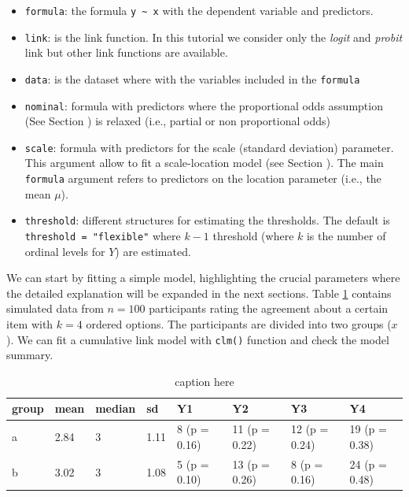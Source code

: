 \documentclass[
  man,floatsintext]{apa6}
\providecommand{\tightlist}{%
  \setlength{\itemsep}{0pt}\setlength{\parskip}{0pt}}
\begin{document}
\begin{itemize}
\tightlist
\item
  \texttt{formula}: the formula \texttt{y\ \textasciitilde{}\ x} with the dependent variable and predictors.
\item
  \texttt{link}: is the link function. In this tutorial we consider only the \emph{logit} and \emph{probit} link but other link functions are available.
\item
  \texttt{data}: is the dataset where with the variables included in the \texttt{formula}
\item
  \texttt{nominal}: formula with predictors where the proportional odds assumption (See Section ) is relaxed (i.e., partial or non proportional odds)
\item
  \texttt{scale}: formula with predictors for the scale (standard deviation) parameter. This argument allow to fit a scale-location model (see Section ). The main \texttt{formula} argument refers to predictors on the location parameter (i.e., the mean \(\mu\)).
\item
  \texttt{threshold}: different structures for estimating the thresholds. The default is \texttt{threshold\ =\ "flexible"} where \(k - 1\) threshold (where \(k\) is the number of ordinal levels for \(Y\)) are estimated.
\end{itemize}

We can start by fitting a simple model, highlighting the crucial parameters where the detailed explanation will be expanded in the next sections. Table \ref{tab:tab-dataset-example} contains simulated data from \(n = 100\) participants rating the agreement about a certain item with \(k = 4\) ordered options. The participants are divided into two groups (\(x\)). We can fit a cumulative link model with \texttt{clm()} function and check the model summary.

\scriptsize

\begin{table}

\caption{\label{tab:tab-dataset-example}caption here}
\centering
\begin{tabular}[t]{llllllll}
\toprule
group & mean & median & sd & Y1 & Y2 & Y3 & Y4\\
\midrule
a & 2.84 & 3 & 1.11 & 8 (p = 0.16) & 11 (p = 0.22) & 12 (p = 0.24) & 19 (p = 0.38)\\
b & 3.02 & 3 & 1.08 & 5 (p = 0.10) & 13 (p = 0.26) & 8 (p = 0.16) & 24 (p = 0.48)\\
\bottomrule
\end{tabular}
\end{table}
\end{document}
